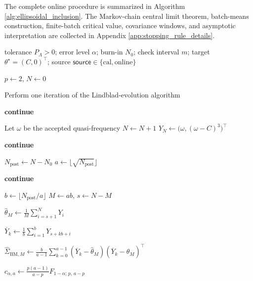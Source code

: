 \documentclass[showpacs,amsmath,amssymb,twocolumn,prx,superscriptaddress,10pt,aps,nofootinbib]{revtex4-2}
\begin{document}
The complete online procedure is summarized in Algorithm \ref{alg:ellipsoidal_inclusion}. The Markov-chain central limit theorem, batch-means construction, finite-batch critical value, covariance windows, and asymptotic interpretation are collected in Appendix \ref{app:stopping_rule_details}.

\begin{algorithm}[H]
\caption{Ellipsoidal inclusion stopping from the accepted
quasi-frequency record}
\label{alg:ellipsoidal_inclusion}

\scriptsize
\begin{algorithmic}[1]

\Require tolerance $P_\Lambda>0$;
error level $\alpha$;
burn-in $N_0$;
check interval $m$;
target $\theta^\star=(C,0)^\top$;
source
$\mathsf{source}\in\{\mathrm{cal},\mathrm{online}\}$

\State $p\gets 2$, $N\gets 0$

\Loop
    \State Perform one iteration of the Lindblad-evolution algorithm

        \State \textbf{continue}
    \EndIf

    \State Let $\omega$ be the accepted quasi-frequency
    \State $N\gets N+1$
    \State
    $Y_N\gets
    \bigl(\omega,(\omega-C)^3\bigr)^\top$

        \State \textbf{continue}
    \EndIf

    \State $N_{\mathrm{post}}\gets N-N_0$
    \State
    $a\gets\lfloor\sqrt{N_{\mathrm{post}}}\rfloor$

        \State \textbf{continue}
    \EndIf

    \State
    $b\gets\lfloor N_{\mathrm{post}}/a\rfloor$
    \State
    $M\gets ab$, \quad $s\gets N-M$

    \State
    $\displaystyle
    \widehat\theta_M
    \gets
    \frac{1}{M}\sum_{i=s+1}^{N}Y_i$

        \State
        $\displaystyle
        \overline Y_k
        \gets
        \frac{1}{b}
        \sum_{i=1}^{b}Y_{s+kb+i}$
    \EndFor

    \State
    $\displaystyle
    \widehat\Sigma_{\mathrm{BM},M}
    \gets
    \frac{b}{a-1}
    \sum_{k=0}^{a-1}
    (\overline Y_k-\widehat\theta_M)
    (\overline Y_k-\widehat\theta_M)^\top$

    \State
    $\displaystyle
    c_{\alpha,a}
    \gets
    \frac{p(a-1)}{a-p}
    F_{1-\alpha;\,p,\,a-p}$


\end{algorithmic}
\end{algorithm}
\end{document}
